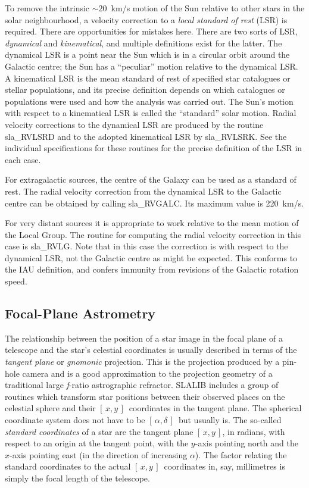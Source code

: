 \documentclass[11pt,twoside,nolof]{starlink}
\providecommand{\radec}     {$[\,\alpha,\delta\,]$}
\providecommand{\xy}        {$[\,x,y\,]$}
\begin{document}
To remove the intrinsic $\sim20$~km/s motion of the Sun relative
to other stars in the solar neighbourhood,
a velocity correction to a
\textit{local standard of rest}\/ (LSR) is required.  There are
opportunities for mistakes here.  There are two sorts of LSR,
\textit{dynamical}\/ and \textit{kinematical}, and
multiple definitions exist for the latter.  The
dynamical LSR is a point near the Sun which is in a circular
orbit around the Galactic centre;  the Sun has a ``peculiar''
motion relative to the dynamical LSR.  A kinematical LSR is
the mean standard of rest of specified star catalogues or stellar
populations, and its precise definition depends on which
catalogues or populations were used and how the analysis was
carried out.  The Sun's motion with respect to a kinematical
LSR is called the ``standard'' solar motion.  Radial
velocity corrections to the dynamical LSR are produced by the routine
sla\_RVLSRD
and to the adopted kinematical LSR by
sla\_RVLSRK.
See the individual specifications for these routines for the
precise definition of the LSR in each case.

For extragalactic sources, the centre of the Galaxy can be used as
a standard of rest.  The radial velocity correction from the
dynamical LSR to the Galactic centre can be obtained by calling
sla\_RVGALC.
Its maximum value is 220~km/s.

For very distant sources it is appropriate to work relative
to the mean motion of the Local Group.  The routine for
computing the radial velocity correction in this case is
sla\_RVLG.
Note that in this case the correction is with respect to the
dynamical LSR, not the Galactic centre as might be expected.
This conforms to the IAU definition, and confers immunity from
revisions of the Galactic rotation speed.

\subsection{Focal-Plane Astrometry}
The relationship between the position of a star image in
the focal plane of a telescope and the star's celestial
coordinates is usually described in terms of the \textit{tangent plane}\/
or \textit{gnomonic}\/ projection.  This is the projection produced
by a pin-hole camera and is a good approximation to the projection
geometry of a traditional large \textit{f}\/-ratio astrographic refractor.
SLALIB includes a group of routines which transform
star positions between their observed places on the celestial
sphere and their \xy\ coordinates in the tangent plane.  The
spherical coordinate system does not have to be \radec\ but
usually is.  The so-called \textit{standard coordinates}\/ of a star
are the tangent plane \xy, in radians, with respect to an origin
at the tangent point, with the $y$-axis pointing north and
the $x$-axis pointing east (in the direction of increasing $\alpha$).
The factor relating the standard coordinates to
the actual \xy\ coordinates in, say, millimetres is simply
the focal length of the telescope.
\end{document}
